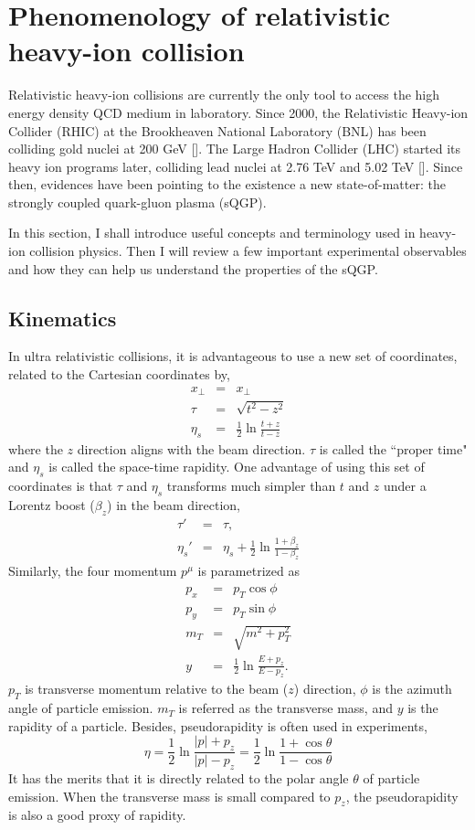 \section{Phenomenology of relativistic heavy-ion collision}
Relativistic heavy-ion collisions are currently the only tool to access the high energy density QCD medium in laboratory.
Since 2000, the Relativistic Heavy-ion Collider (RHIC) at the Brookheaven National Laboratory (BNL) has been colliding gold nuclei at 200 GeV []. 
The Large Hadron Collider (LHC) started its heavy ion programs later, colliding lead nuclei at 2.76 TeV and 5.02 TeV [].
Since then, evidences have been pointing to the existence a new state-of-matter: the strongly coupled quark-gluon plasma (sQGP).

In this section, I shall introduce useful concepts and terminology used in heavy-ion collision physics.
Then I will review a few important experimental observables and how they can help us understand the properties of the sQGP.

\subsection{Kinematics}
In ultra relativistic collisions, it is advantageous to use a new set of coordinates, related to the Cartesian coordinates by,
\begin{eqnarray}
x_\perp &=& x_\perp\\
\tau &=& \sqrt{t^2 - z^2}\\
\eta_s &=& \frac{1}{2}\ln\frac{t+z}{t-z}
\end{eqnarray}
where the $z$ direction aligns with the beam direction.
$\tau$ is called the ``proper time" and $\eta_s$ is called the space-time rapidity.
One advantage of using this set of coordinates is that $\tau$ and $\eta_s$ transforms much simpler than $t$ and $z$ under a Lorentz boost ($\beta_z$) in the beam direction,
\begin{eqnarray}
\tau' &=& \tau,\\
\eta_s' &=& \eta_s + \frac{1}{2}\ln\frac{1+\beta_z}{1-\beta_z}
\end{eqnarray}
Similarly, the four momentum $p^\mu$ is parametrized as 
\begin{eqnarray}
p_x &=& p_T\cos\phi\\
p_y &=& p_T\sin\phi\\
m_T &=& \sqrt{m^2 + p_T^2}\\
y &=& \frac{1}{2}\ln\frac{E+p_z}{E-p_z}.
\end{eqnarray}
$p_T$ is transverse momentum relative to the beam ($z$) direction, $\phi$ is the azimuth angle of particle emission. 
$m_T$ is referred as the transverse mass, and $y$ is the rapidity of a particle.
Besides, pseudorapidity is often used in experiments,
\begin{equation}
\eta = \frac{1}{2}\ln\frac{|p|+p_z}{|p|-p_z} = \frac{1}{2}\ln\frac{1+\cos\theta}{1-\cos\theta}
\end{equation}
It has the merits that it is directly related to the polar angle  $\theta$ of particle emission.
When the transverse mass is small compared to $p_z$, the pseudorapidity is also a good proxy of rapidity.

